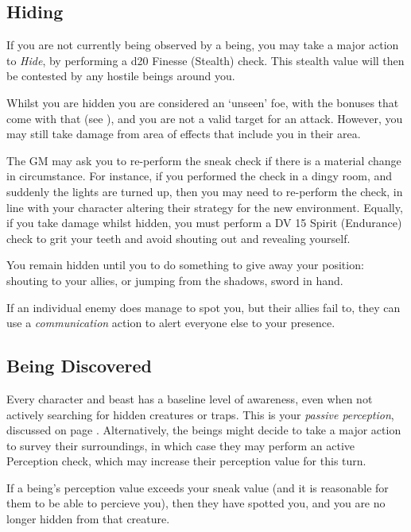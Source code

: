 \subsection{Hiding}

If you are not currently being observed by a being, you may take a major action to {\it Hide}, by performing a d20 Finesse (Stealth) check. This stealth value will then be contested by any hostile beings around you. 

Whilst you are hidden you are considered an `unseen' foe, with the bonuses that come with that (see \pageref{S:Unseen}), and you are not a valid target for an attack. However, you may still take damage from area of effects that include you in their area. 

The GM may ask you to re-perform the sneak check if there is a material change in circumstance. For instance, if you performed the check in a dingy room, and suddenly the lights are turned up, then you may need to re-perform the check, in line with your character altering their strategy for the new environment. Equally, if you take damage whilst hidden, you must perform a DV 15 Spirit (Endurance) check to grit your teeth and avoid shouting out and revealing yourself. 

You remain hidden until you to do something to give away your position: shouting to your allies, or jumping from the shadows, sword in hand. 

If an individual enemy does manage to spot you, but their allies fail to, they can use a {\it communication} action to alert everyone else to your presence. 


\subsection{Being Discovered}

Every character and beast has a baseline level of awareness, even when not actively searching for hidden creatures or traps. This is your {\it passive perception}, discussed on page \pageref{S:PassivePerception}.
Alternatively, the beings might decide to take a major action to survey their surroundings, in which case they may perform an active Perception check, which may increase their perception value for this turn. 

If a being's perception value exceeds your sneak value (and it is reasonable for them to be able to percieve you), then they have spotted you, and you are no longer hidden from that creature.  



